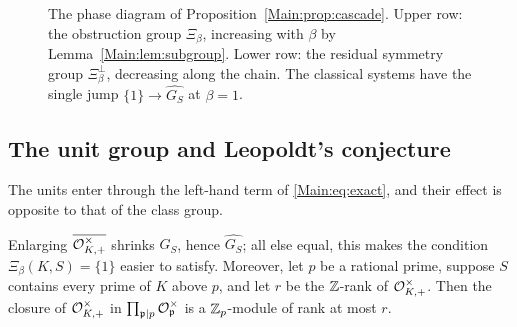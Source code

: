 \begin{figure}[htbp]
\centering
{}
\caption{The phase diagram of Proposition~\ref{Main:prop:cascade}. Upper row: the obstruction
group $\Xi_\beta$, increasing with $\beta$ by Lemma~\ref{Main:lem:subgroup}. Lower row: the
residual symmetry group $\Xi_\beta^\perp$, decreasing along the chain. The classical
systems have the single jump $\{1\}\to\widehat{G_S}$ at $\beta=1$.}
\label{Main:fig:cascade}
\end{figure}

\subsection{The unit group and Leopoldt's conjecture}\label{Main:sec:units}

The units enter through the left-hand term of \eqref{Main:eq:exact}, and their effect
is opposite to that of the class group.

\begin{proposition}\label{Main:prop:units}
Enlarging $\overline{\mathcal{O}^\times_{K,+}}$ shrinks $G_S$, hence $\widehat{G_S}$;
all else equal, this makes the condition $\Xi_\beta(K,S)=\{1\}$ easier to
satisfy. Moreover, let $p$ be a rational prime, suppose $S$ contains every
prime of $K$ above $p$, and let $r$ be the $\mathbb{Z}$-rank of $\mathcal{O}^\times_{K,+}$.
Then the closure of $\mathcal{O}^\times_{K,+}$ in $\prod_{\mathfrak{p}\mid p}\mathcal{O}_{\mathfrak{p}}^\times$ is a
$\mathbb{Z}_p$-module of rank at most $r$.
\end{proposition}

